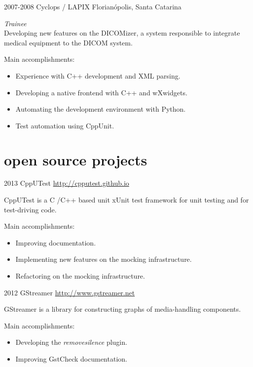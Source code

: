 \documentclass[]{friggeri-cv} %
\begin{document}
\begin{entrylist}
\entry
{2007-2008}
{Cyclops / LAPIX}
{Florianópolis, Santa Catarina}
{\emph{Trainee} \\

Developing new features on the DICOMizer, a system responsible to integrate medical equipment to the DICOM system.

Main accomplishments:\\

\begin{itemize}
\item Experience with C++ development and XML parsing.
\item Developing a native frontend with C++ and wXwidgets.
\item Automating the development environment with Python.
\item Test automation using CppUnit.
\end{itemize}
}
\end{entrylist}


\pagebreak
\section{open source projects}

\begin{entrylist}
\entry
{2013}
{CppUTest}
{\href{http://cpputest.github.io}{http://cpputest.github.io}}
{
CppUTest is a C /C++ based unit xUnit test framework for unit testing and for test-driving code.

Main accomplishments:\\
\begin{itemize}
\item Improving documentation.
\item Implementing new features on the mocking infrastructure.
\item Refactoring on the mocking infrastructure.
\end{itemize}
}
\end{entrylist}

\begin{entrylist}
\entry
{2012}
{GStreamer}
{\href{http://www.gstreamer.net}{http://www.gstreamer.net}}
{
GStreamer is a library for constructing graphs of media-handling components.

Main accomplishments:\\
\begin{itemize}
\item Developing the \emph{removesilence} plugin.
\item Improving GstCheck documentation.
\end{itemize}
}
\end{entrylist}
\end{document}
